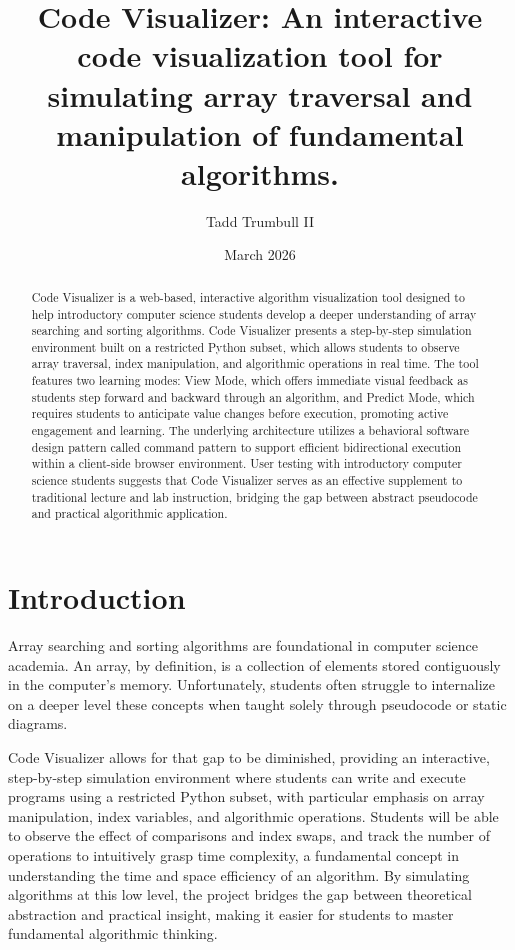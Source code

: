 \documentclass{IEEEtran}
\title{Code Visualizer: An interactive code visualization tool for simulating array traversal and manipulation of fundamental algorithms.}
\author{Tadd Trumbull II}
\date{March 2026}
\begin{document}
\maketitle

\begin{abstract}
Code Visualizer is a web-based, interactive algorithm visualization tool designed to help introductory computer science students develop a deeper understanding of array searching and sorting algorithms. Code Visualizer presents a step-by-step simulation environment built on a restricted Python subset, which allows students to observe array traversal, index manipulation, and algorithmic operations in real time. The tool features two learning modes: View Mode, which offers immediate visual feedback as students step forward and backward through an algorithm, and Predict Mode, which requires students to anticipate value changes before execution, promoting active engagement and learning. The underlying architecture utilizes a behavioral software design pattern called command pattern to support efficient bidirectional execution within a client-side browser environment. User testing with introductory computer science students suggests that Code Visualizer serves as an effective supplement to traditional lecture and lab instruction, bridging the gap between abstract pseudocode and practical algorithmic application.
\end{abstract}

\section{Introduction}
Array searching and sorting algorithms are foundational in computer science academia. An array, by definition, is a collection of elements stored contiguously in the computer's memory. Unfortunately, students often struggle to internalize on a deeper level these concepts when taught solely through pseudocode or static diagrams.

Code Visualizer allows for that gap to be diminished, providing an interactive, step-by-step simulation environment where students can write and execute programs using a restricted Python subset, with particular emphasis on array manipulation, index variables, and algorithmic operations. Students will be able to observe the effect of comparisons and index swaps, and track the number of operations to intuitively grasp time complexity, a fundamental concept in understanding the time and space efficiency of an algorithm. By simulating algorithms at this low level, the project bridges the gap between theoretical abstraction and practical insight, making it easier for students to master fundamental algorithmic thinking.
\end{document}
